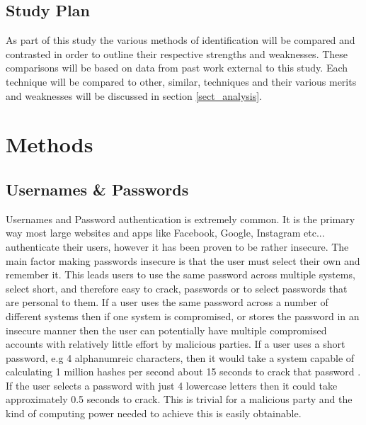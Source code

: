 \documentclass[12pt]{article}
\begin{document}
	\subsection{Study Plan}
	As part of this study the various methods of identification will be compared and contrasted in order to outline their respective strengths and weaknesses. These comparisons will be based on data from past work external to this study.
	Each technique will be compared to other, similar, techniques and their various merits and weaknesses will be discussed in section \ref{sect_analysis}.
	
	\section{Methods}
	\label{sect_methods}
	\subsection{Usernames \& Passwords}
	Usernames and Password authentication is extremely common. It is the primary way most large websites and apps like Facebook, Google, Instagram etc... authenticate their users, however it has been proven to be rather insecure. The main factor making passwords insecure is that the user must select their own and remember it. This leads users to use the same password across multiple systems, select short, and therefore easy to crack, passwords or to select passwords that are personal to them.
	If a user uses the same password across a number of different systems then if one system is compromised, or stores the password in an insecure manner then the user can potentially have multiple compromised accounts with relatively little effort by malicious parties.
	If a user uses a short password, e.g 4 alphanumreic characters, then it would take a system capable of calculating 1 million hashes per second about 15 seconds to crack that password \citep{kessler1996passwords}. If the user selects a password with just 4 lowercase letters then it could take approximately 0.5 seconds to crack. This is trivial for a malicious party and the kind of computing power needed to achieve this is easily obtainable.
\end{document}
